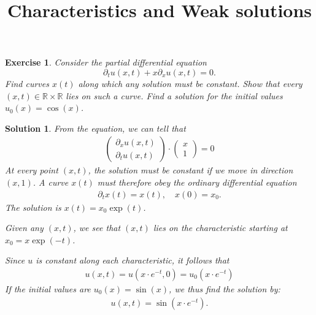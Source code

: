 \documentclass[10pt,letterpaper]{article}
\theoremstyle{break}
\newtheorem{exercise}{Exercise}
\newtheorem{mysolution}{Solution}
\newenvironment{solution}{\begin{mysolution}}{\end{mysolution}}
\begin{document}
\title{Characteristics and Weak solutions}
\date{}

\maketitle























\begin{exercise}
    Consider the partial differential equation
    $$
        \partial_t u(x,t) + x \partial_x u(x,t) = 0.
    $$
    Find curves $x(t)$ along which any solution must be constant.
    Show that every $(x,t) \in \mathbb R \times \mathbb R$ lies on such a curve. 
    Find a solution for the initial values $u_0(x) = \cos(x)$.
\end{exercise}
\begin{solution}
    From the equation, we can tell that 
    \begin{align*}
        \begin{pmatrix} \partial_x u(x,t) \\ \partial_t u(x,t) \end{pmatrix}
        \cdot 
        \begin{pmatrix} x \\ 1 \end{pmatrix}
        = 
        0
    \end{align*}
    At every point $(x,t)$, the solution must be constant if we move in direction $(x,1)$. 
    A curve $x(t)$ must therefore obey the ordinary differential equation 
    \begin{align*}
        \partial_t x(t) = x(t), \quad x(0) = x_0.
    \end{align*}
    The solution is $x(t) = x_0 \exp(t)$.
    
    Given any $(x,t)$, we see that $(x,t)$ lies on the characteristic starting at $x_0 = x \exp(-t)$. 
    
    Since $u$ is constant along each characteristic, it follows that 
    \begin{align*}
        u(x,t) = u\left( x \cdot e^{-t} , 0 \right) = u_0\left( x \cdot e^{-t} \right)
    \end{align*}
    If the initial values are $u_0(x) = \sin(x)$, we thus find the solution by:
    \begin{align*}
        u(x,t) = \sin\left( x \cdot e^{-t} \right).
    \end{align*}
\end{solution}
\end{document}
